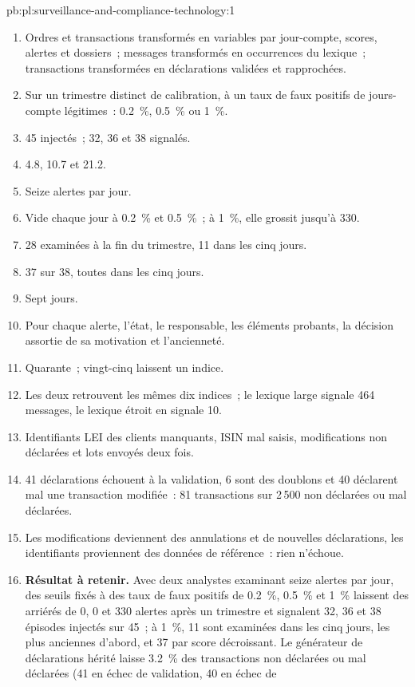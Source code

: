 \begin{solution}{pb:pl:surveillance-and-compliance-technology:1}
\begin{enumerate}
\item Ordres et transactions transformés en variables par jour-compte, scores, alertes et dossiers~; messages transformés en occurrences du lexique~; transactions transformées en
déclarations validées et rapprochées.
\item Sur un trimestre distinct de calibration, à un taux de faux positifs de jours-compte légitimes~: 0.2~\%, 0.5~\% ou 1~\%.
\item 45 injectés~; 32, 36 et 38 signalés.
\item 4.8, 10.7 et 21.2.
\item Seize alertes par jour.
\item Vide chaque jour à 0.2~\% et 0.5~\%~; à 1~\%, elle grossit jusqu'à 330.
\item 28 examinées à la fin du trimestre, 11 dans les cinq jours.
\item 37 sur 38, toutes dans les cinq jours.
\item Sept jours.
\item Pour chaque alerte, l'état, le responsable, les éléments probants, la décision assortie de sa motivation et l'ancienneté.
\item Quarante~; vingt-cinq laissent un indice.
\item Les deux retrouvent les mêmes dix indices~; le lexique large signale 464 messages, le lexique étroit en signale 10.
\item Identifiants LEI des clients manquants, ISIN mal saisis, modifications non déclarées et lots envoyés deux fois.
\item 41 déclarations échouent à la validation, 6 sont des doublons et 40 déclarent mal une transaction modifiée~: 81 transactions sur 2\,500 non déclarées ou mal déclarées.
\item Les modifications deviennent des annulations et de nouvelles déclarations, les identifiants proviennent des données de référence~: rien n'échoue.
\item \textbf{Résultat à retenir.} Avec deux analystes examinant seize alertes par jour, des seuils fixés à des taux de faux positifs de 0.2~\%, 0.5~\% et 1~\% laissent
des arriérés de 0, 0 et 330 alertes après un trimestre et signalent 32, 36 et 38 épisodes injectés sur 45~; à 1~\%, 11 sont examinées dans les cinq jours, les plus anciennes
d'abord, et 37 par score décroissant. Le générateur de déclarations hérité laisse 3.2~\% des transactions non déclarées ou mal déclarées (41 en échec de validation, 40 en échec de

\end{enumerate}
\end{solution}
